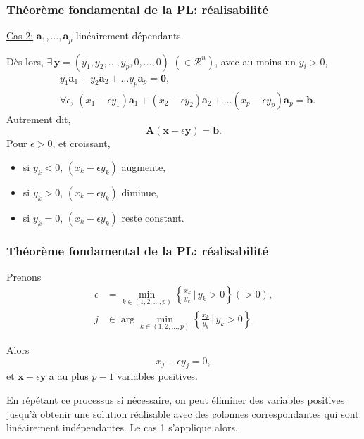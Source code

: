 \documentclass[usepdftitle=false]{beamer}
\def\ba{\boldsymbol{a}}
\def\bb{\boldsymbol{b}}
\def\bx{\boldsymbol{x}}
\def\by{\boldsymbol{y}}
\def\bA{\boldsymbol{A}}
\def\bzero{\boldsymbol{0}}
\begin{document}
\begin{frame}
\frametitle{Théorème fondamental de la PL: réalisabilité}

\underline{Cas 2:} $\ba_1,\ldots,\ba_p$ linéairement dépendants.

Dès lors, $\exists\, \by = (y_1, y_2,\ldots, y_p,0,\ldots,0)$ $(\in \mathcal{R}^n)$, avec au moins un $y_i > 0$,
\begin{align*}
&y_1 \ba_1 + y_2 \ba_2 + \ldots y_p \ba_p = \bzero, \\
& \forall \epsilon, \ (x_1 - \epsilon y_1) \ba_1 + (x_2 - \epsilon y_2) \ba_2 + \ldots (x_p - \epsilon y_p) \ba_p = \bb.
\end{align*}
Autrement dit,
\[
\bA(\bx-\epsilon \by) = \bb.
\]
Pour $\epsilon > 0$, et croissant,
\begin{itemize}
\item 
si $y_k < 0$, $(x_k - \epsilon y_k)$ augmente,
\item 
si $y_k > 0$, $(x_k - \epsilon y_k)$ diminue,
\item 
si $y_k = 0$, $(x_k - \epsilon y_k)$ reste constant.
\end{itemize}
\end{frame}

\begin{frame}
\frametitle{Théorème fondamental de la PL: réalisabilité}

Prenons
\begin{align*}
\epsilon &= \min_{k \in (1,2,\ldots,p)} \left\lbrace \frac{x_k}{y_k} \,\bigg|\, y_k > 0 \right\rbrace (>0), \\
j &\in \arg \min_{k \in (1,2,\ldots,p)} \left\lbrace \frac{x_k}{y_k} \,\bigg|\, y_k > 0 \right\rbrace.
\end{align*}

Alors
$$
x_j - \epsilon y_j = 0,
$$
et $\bx - \epsilon\by$ a au plus $p-1$ variables positives.

\mbox{}

En répétant ce processus si nécessaire, on peut éliminer des variables positives jusqu'à obtenir une solution réalisable avec des colonnes correspondantes qui sont linéairement indépendantes. Le cas 1 s'applique alors.

\end{frame}
\end{document}
